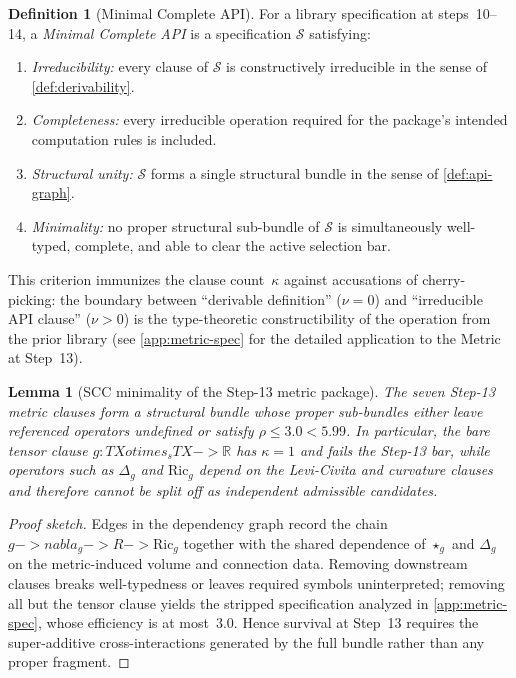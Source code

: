\documentclass[11pt,a4paper]{article}
\def\to{->}%
\def\otimes{otimes}%
\def\nabla{nabla}%
\theoremstyle{plain}
\newtheorem{lemma}[theorem]{Lemma}
\theoremstyle{definition}
\newtheorem{definition}[theorem]{Definition}
\theoremstyle{remark}
\begin{document}
\begin{definition}[Minimal Complete API]
\label{def:minimal-api}
For a library specification at steps~10--14, a \emph{Minimal Complete API} is a specification $\mathcal{S}$ satisfying:
\begin{enumerate}[nosep]
    \item \emph{Irreducibility:} every clause of $\mathcal{S}$ is constructively irreducible in the sense of \cref{def:derivability}.
    \item \emph{Completeness:} every irreducible operation required for the package's intended computation rules is included.
    \item \emph{Structural unity:} $\mathcal{S}$ forms a single structural bundle in the sense of \cref{def:api-graph}.
    \item \emph{Minimality:} no proper structural sub-bundle of $\mathcal{S}$ is simultaneously well-typed, complete, and able to clear the active selection bar.
\end{enumerate}
This criterion immunizes the clause count~$\kappa$ against accusations of cherry-picking: the boundary between ``derivable definition'' ($\nu = 0$) and ``irreducible API clause'' ($\nu > 0$) is the type-theoretic constructibility of the operation from the prior library (see \cref{app:metric-spec} for the detailed application to the Metric at Step~13).
\end{definition}

\begin{lemma}[SCC minimality of the Step-13 metric package]
\label{lem:metric-scc}
The seven Step-13 metric clauses form a structural bundle whose proper sub-bundles either leave referenced operators undefined or satisfy $\rho \le 3.0 < 5.99$.
In particular, the bare tensor clause $g : TX \otimes_s TX \to \mathbb{R}$ has $\kappa=1$ and fails the Step-13 bar, while operators such as $\Delta_g$ and $\mathrm{Ric}_g$ depend on the Levi-Civita and curvature clauses and therefore cannot be split off as independent admissible candidates.
\end{lemma}

\begin{proof}[Proof sketch]
Edges in the dependency graph record the chain $g \to \nabla_g \to R \to \mathrm{Ric}_g$ together with the shared dependence of $\star_g$ and $\Delta_g$ on the metric-induced volume and connection data.
Removing downstream clauses breaks well-typedness or leaves required symbols uninterpreted; removing all but the tensor clause yields the stripped specification analyzed in \cref{app:metric-spec}, whose efficiency is at most~$3.0$.
Hence survival at Step~13 requires the super-additive cross-interactions generated by the full bundle rather than any proper fragment.
\end{proof}
\end{document}
